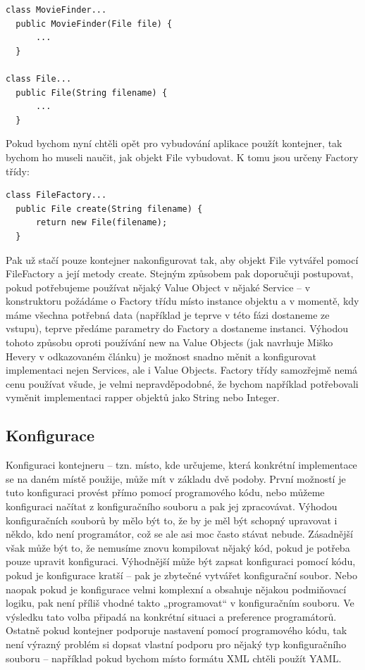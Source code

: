 \documentclass[a4paper,conference]{IEEEtran}
\begin{document}
\lstset{language=Java, caption=Naplnění proměnné finder s využitím interface, label=listing:Java}
\begin{lstlisting}
class MovieFinder...
  public MovieFinder(File file) {
      ...
  }

class File...
  public File(String filename) {
      ...
  }
\end{lstlisting}

Pokud bychom nyní chtěli opět pro vybudování aplikace použít kontejner, tak bychom ho museli naučit, jak objekt File vybudovat. K tomu jsou určeny Factory třídy:

\lstset{language=Java, caption=Naplnění proměnné finder s využitím interface, label=listing:Java}
\begin{lstlisting}
class FileFactory...
  public File create(String filename) {
      return new File(filename);
  }
\end{lstlisting}

Pak už stačí pouze kontejner nakonfigurovat tak, aby objekt File vytvářel pomocí FileFactory a její metody create. Stejným způsobem pak doporučuji postupovat, pokud potřebujeme používat nějaký Value Object v nějaké Service – v konstruktoru požádáme o Factory třídu místo instance objektu a v momentě, kdy máme všechna potřebná data (například je teprve v této fázi dostaneme ze vstupu), teprve předáme parametry do Factory a dostaneme instanci. Výhodou tohoto způsobu oproti používání new na Value Objects (jak navrhuje Miško Hevery v odkazovaném článku) je možnost snadno měnit a konfigurovat implementaci nejen Services, ale i Value Objects. Factory třídy samozřejmě nemá cenu používat všude, je velmi nepravděpodobné, že bychom například potřebovali vyměnit implementaci rapper objektů jako String nebo Integer.

\subsection{Konfigurace}

Konfiguraci kontejneru – tzn. místo, kde určujeme, která konkrétní implementace se na daném místě použije, může mít v základu dvě podoby. První možností je tuto konfiguraci provést přímo pomocí programového kódu, nebo můžeme konfiguraci načítat z konfiguračního souboru a pak jej zpracovávat.
Výhodou konfiguračních souborů by mělo být to, že by je měl být schopný upravovat i někdo, kdo není programátor, což se ale asi moc často stávat nebude. Zásadnější však může být to, že nemusíme znovu kompilovat nějaký kód, pokud je potřeba pouze upravit konfiguraci.
Výhodnější může být zapsat konfiguraci pomocí kódu, pokud je konfigurace kratší – pak je zbytečné vytvářet konfigurační soubor. Nebo naopak pokud je konfigurace velmi komplexní a obsahuje nějakou podmiňovací logiku, pak není příliš vhodné takto „programovat“ v konfiguračním souboru.
Ve výsledku tato volba připadá na konkrétní situaci a preference programátorů. Ostatně pokud kontejner podporuje nastavení pomocí programového kódu, tak není výrazný problém si dopsat vlastní podporu pro nějaký typ konfiguračního souboru – například pokud bychom místo formátu XML chtěli použít YAML.
\end{document}
